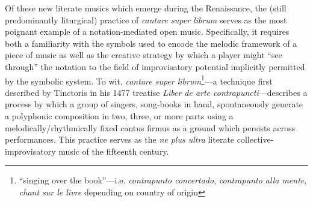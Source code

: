     Of these new literate musics which emerge during the Renaissance, the (still predominantly liturgical) practice of \textit{cantare super librum} serves as the most poignant example of a notation-mediated open music. Specifically, it requires both a familiarity with the symbols used to encode the melodic framework of a piece of music as well as the creative strategy by which a player might ``see through'' the notation to the field of improvisatory potential implicitly permitted by the symbolic system. To wit, \textit{cantare super librum}\footnote{``singing over the book''---i.e. \textit{contrapunto concertado}, \textit{contrapunto alla mente}, \textit{chant sur le livre} depending on country of origin}---a technique first described by Tinctoris in his 1477 treatise \textit{Liber de arte contrapuncti}---describes a process by which a group of singers, song-books in hand, spontaneously generate a polyphonic composition in two, three, or more parts using a melodically/rhythmically fixed cantus firmus as a ground which persists across performances. This practice serves as the \textit{ne plus ultra} literate collective-improvisatory music of the fifteenth century. 



